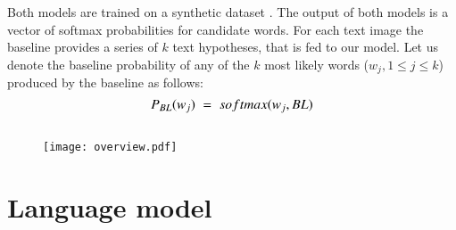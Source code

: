\documentclass[phd,tocprelim]{cornell}
\renewcommand{\caption}[1]{\singlespacing\hangcaption{#1}\normalspacing}
\begin{document}
Both models are trained on a synthetic dataset \cite{jaderberg2014synthetic}. The output of both models is a vector of softmax probabilities for candidate words.
For each text image the baseline provides a series of $k$ text hypotheses, that is fed to our model. Let us denote the baseline probability of any of the $k$ most likely words ($w_j, 1\le j\le k$) produced by the baseline as follows: 
\begin{equation} 
\small \begin{array}{l}P_{BL}(w_j)\;=\;softmax(w_j,BL)\\\\\end{array}
\end{equation}




\begin{figure}
\centering 

\texttt{[image: overview.pdf]} 
\caption{overview.}
 \end{figure} 





\section{Language model}
\end{document}
